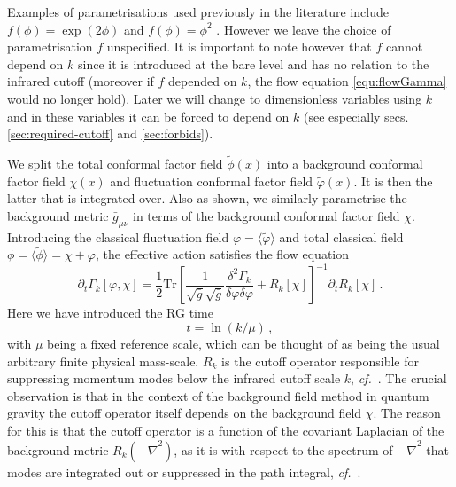 \documentclass[11pt]{book} %
\newcommand\cf{\textit{cf.}\ }
\newcommand{\vp}{\varphi}
\newcommand{\be}{\begin{equation}}
\newcommand{\ee}{\end{equation}}
\begin{document}
Examples of parametrisations used previously in the literature include
$f(\phi) = \exp(2\phi)$ \cite{Machado:2009ph} and $f(\phi)=\phi^2$ \cite{Manrique:2009uh,Bonanno:2012dg}. However we leave the choice of parametrisation $f$ unspecified. It is important to note however that $f$ cannot depend on $k$ since it is introduced at the bare level and has no relation to the infrared cutoff (moreover if $f$ depended on $k$, the flow equation \eqref{equ:flowGamma} would no longer hold).  Later we will change to dimensionless variables using $k$ and in these variables it can be forced to depend on $k$   (see especially secs. \ref{sec:required-cutoff} and \ref{sec:forbids}).

We split the total conformal factor field $\tilde\phi(x)$ into a background conformal factor field $\chi(x)$ and fluctuation conformal factor field $\tilde\vp(x)$. It is then the latter that is integrated over. Also as shown, we similarly parametrise the background metric $\bar{g}_{\mu\nu}$ in terms of the background conformal factor field $\chi$. Introducing the classical fluctuation field $\vp = \langle \tilde \vp \rangle$ and total classical field $\phi = \langle \tilde \phi \rangle = \chi + \vp$, the effective action  satisfies the flow equation
\be
\label{equ:flowGamma}
\partial_t \Gamma_k[\vp,\chi] = \frac{1}{2}\mathrm{Tr}\left[\frac{1}{\sqrt{\bar g}\sqrt{\bar g}}\frac{\delta^2\Gamma_k}
				  {\delta \vp \delta \vp}+ R_k[\chi]\right]^{-1} \partial_t R_k[\chi]\,.
\ee
 Here we have introduced the RG time
\be
\label{time}
t=\ln(k/\mu)\,,
\ee
with $\mu$ being a fixed reference scale, which can be thought of as being the usual arbitrary
finite physical mass-scale.
$R_k$ is the cutoff operator responsible for suppressing momentum modes below the
infrared cutoff scale $k$, \cf \cite{Wetterich:1992yh, Morris:1993qb}.
The crucial observation is that in the context of the background field method in quantum gravity the cutoff operator itself depends on the background field $\chi$. The reason for this is that the cutoff operator is a function of the covariant Laplacian of the background metric $R_k\left(-\bar \nabla^2\right)$, as it is with respect to the spectrum of $-\bar\nabla^2$ that modes are integrated out or suppressed in the path integral, \cf \cite{Reuter:2008wj,Reuter:2009kq}.
\end{document}
